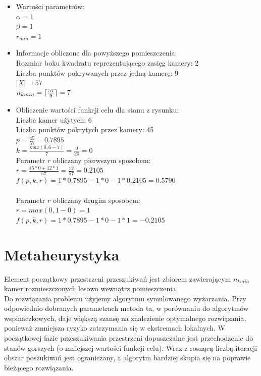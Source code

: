\documentclass[12pt,a4paper]{article}
\DeclarePairedDelimiter{\ceil}{\lceil}{\rceil}
\begin{document}
\begin{itemize}
	\item Wartości parametrów:\\
	$\alpha = 1$\\
	$\beta = 1$\\
	$r_{min} = 1$
	\item Informacje obliczone dla powyższego pomieszczenia:\\
	Rozmiar boku kwadratu reprezentującego zasięg kamery: 2\\
	Liczba punktów pokrywanych przez jedną kamerę: 9\\
	$|X| = 57$\\
	$n_{kmin} = \ceil{\frac{57}{9}} = 7$\\

	\item Obliczenie wartości funkcji celu dla stanu z rysunku:\\
	Liczba kamer użytych: 6\\
	Liczba punktów pokrytych przez kamery: 45\\
	$p = \frac{45}{57} = 0.7895$\\
	$k = \frac{max(0, 6-7)}{7} = \frac{0}{20} = 0$\\
	Parametr $r$ obliczany pierwszym sposobem:\\
	$r = \frac{45*0 + 12*1}{57} = \frac{12}{57} = 0.2105$\\
	$f(p, k, r) = 1*0.7895 - 1*0 - 1*0.2105 = 0.5790$\\\\
	Parametr $r$ obliczany drugim sposobem:\\
	$r = max(0, 1-0) = 1$\\
	$f(p, k, r) = 1*0.7895 - 1*0 - 1*1 = -0.2105$
\end{itemize}

\section{Metaheurystyka}
Element początkowy przestrzeni przeszukiwań jest zbiorem zawierającym $n_{kmin}$ kamer rozmieszczonych losowo wewnątrz pomieszczenia.\\
Do rozwiązania problemu użyjemy algorytmu symulowanego wyżarzania. Przy odpowiednio dobranych parametrach metoda ta, w porównaniu do algorytmów wspinaczkowych, daje większą szansę na znalezienie optymalnego rozwiązania, ponieważ zmniejsza ryzyko zatrzymania się w ekstremach lokalnych. W początkowej fazie przeszukiwania przestrzeni dopuszczalne jest przechodzenie do stanów gorszych (o mniejszej wartości funkcji celu). Wraz z rosnącą liczbą iteracji obszar poszukiwań jest ograniczany, a algorytm bardziej skupia się na poprawie bieżącego rozwiązania.
\end{document}
